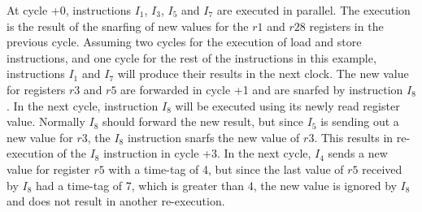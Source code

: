 \documentclass[10pt,twocolumn]{IEEEtran}
\begin{document}
At cycle +0, instructions $I_1$, $I_3$, $I_5$ and $I_7$ are
executed in parallel.  The execution is the result of the snarfing
of new values for the $r1$ and $r28$ registers in the previous cycle.
Assuming two cycles for the execution of load and store
instructions, and one cycle for the rest of the instructions in
this example, instructions $I_1$ and $I_7$ will produce their
results in the next clock. 
The new value for registers $r3$ and
$r5$ are forwarded in cycle +1 and are snarfed by instruction
$I_8$. 
In the next cycle, instruction $I_8$ will be executed using
its newly read register value.  Normally $I_8$ should forward the
new result, but since $I_5$ is sending out a new value for $r3$,
the $I_8$ instruction snarfs the new value of $r3$.  This results
in re-execution of the $I_8$ instruction in cycle +3.  In the next
cycle, $I_4$ sends a new value for register $r5$ with a time-tag
of 4, but since the last value of $r5$ received by $I_8$ had a
time-tag of 7, which is greater than 4, the new value is ignored
by $I_8$ and does not result in another re-execution.
%
%
\end{document}
